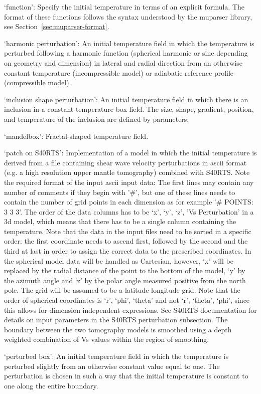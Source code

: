 \begin{itemize}
`function': Specify the initial temperature in terms of an explicit formula. The format of these functions follows the syntax understood by the muparser library, see Section~\ref{sec:muparser-format}.

`harmonic perturbation': An initial temperature field in which the temperature is perturbed following a harmonic function (spherical harmonic or sine depending on geometry and dimension) in lateral and radial direction from an otherwise constant temperature (incompressible model) or adiabatic reference profile (compressible model).

`inclusion shape perturbation': An initial temperature field in which there is an inclusion in a constant-temperature box field. The size, shape, gradient, position, and temperature of the inclusion are defined by parameters.

`mandelbox': Fractal-shaped temperature field.

`patch on S40RTS': Implementation of a model in which the initial temperature is derived from a file containing shear wave velocity perturbations in ascii format (e.g. a high resolution upper mantle tomography) combined with S40RTS. Note the required format of the input ascii input data: The first lines may contain any number of comments if they begin with '\#', but one of these lines needs to contain the number of grid points in each dimension as for example '\# POINTS: 3 3 3'. The order of the data columns has to be  `x', `y', `z', 'Vs Perturbation' in a 3d model, which means that there has to be a single column containing the temperature. Note that the data in the input files need to be sorted in a specific order: the first coordinate needs to ascend first, followed by the second and the third at last in order to assign the correct data to the prescribed coordinates. In the spherical model data will be handled as Cartesian, however, `x' will be replaced by the radial distance of the point to the bottom of the model, `y' by the azimuth angle and `z' by the polar angle measured positive from the north pole. The grid will be assumed to be a latitude-longitude grid. Note that the order of spherical coordinates is `r', `phi', `theta' and not `r', `theta', `phi', since this allows for dimension independent expressions. See S40RTS documentation for details on input parameters in the S40RTS perturbation subsection. The boundary between the two tomography models is smoothed using a depth weighted combination of Vs values within the region of smoothing. 

`perturbed box': An initial temperature field in which the temperature is perturbed slightly from an otherwise constant value equal to one. The perturbation is chosen in such a way that the initial temperature is constant to one along the entire boundary.


\end{itemize}
